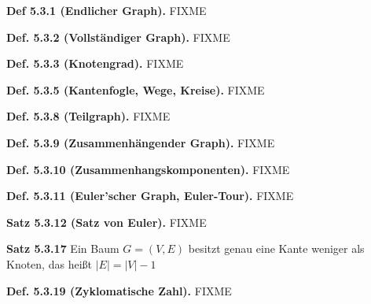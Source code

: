\textbf{Def 5.3.1 (Endlicher Graph).} FIXME 

\textbf{Def. 5.3.2 (Vollständiger Graph).} FIXME

\textbf{Def. 5.3.3 (Knotengrad).} FIXME

\textbf{Def. 5.3.5 (Kantenfogle, Wege, Kreise).} FIXME

\textbf{Def. 5.3.8 (Teilgraph).} FIXME

\textbf{Def. 5.3.9 (Zusammenhängender Graph).} FIXME

\textbf{Def. 5.3.10 (Zusammenhangskomponenten).} FIXME

\textbf{Def. 5.3.11 (Euler\textquoteright{}scher Graph, Euler-Tour).} FIXME

\textbf{Satz 5.3.12 (Satz von Euler).} FIXME

\textbf{Satz 5.3.17} Ein Baum $G=(V,E)$ besitzt genau eine Kante
weniger als Knoten, das heißt $\vert E\vert=\vert V\vert-1$

\textbf{Def. 5.3.19 (Zyklomatische Zahl).} FIXME

